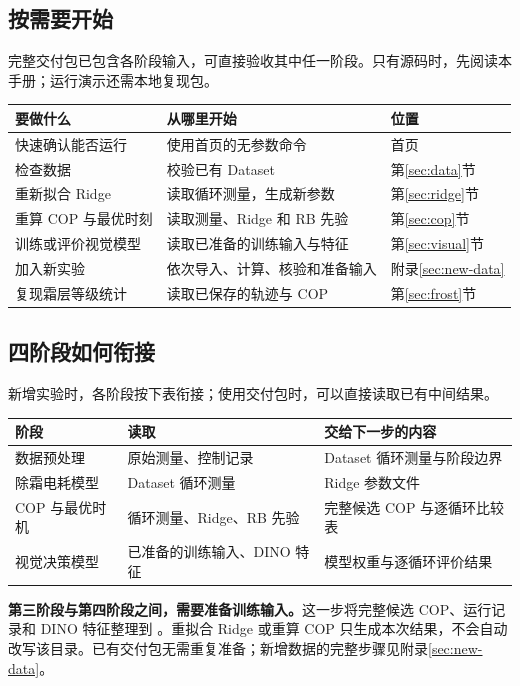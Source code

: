 \documentclass[UTF8,11pt,a4paper,fontset=fandol]{ctexart}
\begin{document}
\subsection{按需要开始}
完整交付包已包含各阶段输入，可直接验收其中任一阶段。只有源码时，先阅读本手册；运行演示还需本地复现包。
\begin{table}[H]
\centering
\begin{tabularx}{\textwidth}{p{36mm}Yp{23mm}}
\toprule
要做什么 & 从哪里开始 & 位置 \\
\midrule
快速确认能否运行 & 使用首页的无参数命令 & 首页 \\
检查数据 & 校验已有 Dataset & 第\ref{sec:data}节 \\
重新拟合 Ridge & 读取循环测量，生成新参数 & 第\ref{sec:ridge}节 \\
重算 COP 与最优时刻 & 读取测量、Ridge 和 RB 先验 & 第\ref{sec:cop}节 \\
训练或评价视觉模型 & 读取已准备的训练输入与特征 & 第\ref{sec:visual}节 \\
加入新实验 & 依次导入、计算、核验和准备输入 & 附录\ref{sec:new-data} \\
复现霜层等级统计 & 读取已保存的轨迹与 COP & 第\ref{sec:frost}节 \\
\bottomrule
\end{tabularx}
\end{table}

\subsection{四阶段如何衔接}
新增实验时，各阶段按下表衔接；使用交付包时，可以直接读取已有中间结果。
\begin{table}[H]
\centering
\begin{tabularx}{\textwidth}{p{31mm}YY}
\toprule
阶段 & 读取 & 交给下一步的内容 \\
\midrule
数据预处理 & 原始测量、控制记录 & Dataset 循环测量与阶段边界 \\
除霜电耗模型 & Dataset 循环测量 & Ridge 参数文件 \\
COP 与最优时机 & 循环测量、Ridge、RB 先验 & 完整候选 COP 与逐循环比较表 \\
视觉决策模型 & 已准备的训练输入、DINO 特征 & 模型权重与逐循环评价结果 \\
\bottomrule
\end{tabularx}
\end{table}
\textbf{第三阶段与第四阶段之间，需要准备训练输入。}这一步将完整候选 COP、运行记录和 DINO 特征整理到 。重拟合 Ridge 或重算 COP 只生成本次结果，不会自动改写该目录。已有交付包无需重复准备；新增数据的完整步骤见附录\ref{sec:new-data}。
\end{document}

